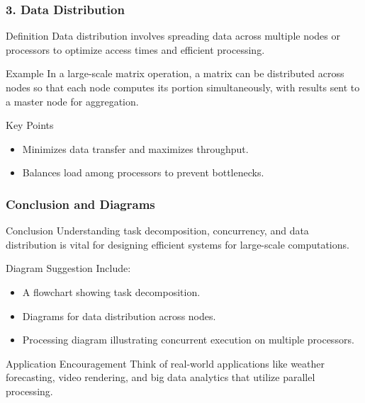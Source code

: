 \documentclass[aspectratio=169]{beamer}
\begin{document}
\begin{frame}[fragile]
    \frametitle{3. Data Distribution}
    \begin{block}{Definition}
        Data distribution involves spreading data across multiple nodes or processors to optimize access times and efficient processing.
    \end{block}
    
    \begin{block}{Example}
        In a large-scale matrix operation, a matrix can be distributed across nodes so that each node computes its portion simultaneously, with results sent to a master node for aggregation.
    \end{block}
    
    \begin{block}{Key Points}
        \begin{itemize}
            \item Minimizes data transfer and maximizes throughput.
            \item Balances load among processors to prevent bottlenecks.
        \end{itemize}
    \end{block}
\end{frame}

\begin{frame}[fragile]
    \frametitle{Conclusion and Diagrams}
    \begin{block}{Conclusion}
        Understanding task decomposition, concurrency, and data distribution is vital for designing efficient systems for large-scale computations.
    \end{block}
    
    \begin{block}{Diagram Suggestion}
        Include:
        \begin{itemize}
            \item A flowchart showing task decomposition.
            \item Diagrams for data distribution across nodes.
            \item Processing diagram illustrating concurrent execution on multiple processors.
        \end{itemize}
    \end{block}
    
    \begin{block}{Application Encouragement}
        Think of real-world applications like weather forecasting, video rendering, and big data analytics that utilize parallel processing.
    \end{block}
\end{frame}
\end{document}
